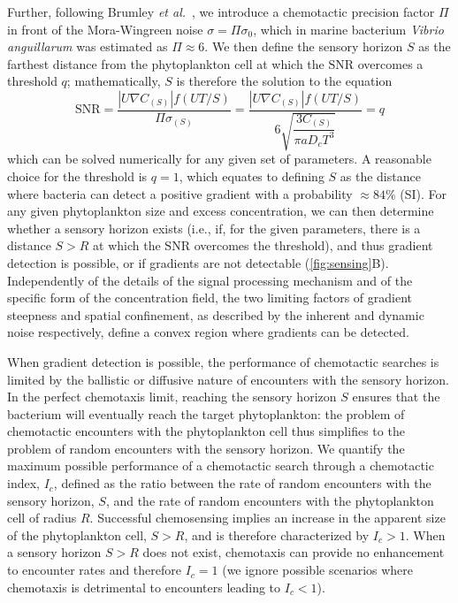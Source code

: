\documentclass[9pt,twocolumn,twoside]{pnas-new}
\newcommand{\SNR}{\mathrm{SNR}}
\begin{document}
Further, following Brumley \textit{et al.}~\cite{brumley2019bacteria}, we introduce a chemotactic precision factor $\Pi$ in front of the Mora-Wingreen noise $\sigma = \Pi\sigma_0$, which in marine bacterium \textit{Vibrio anguillarum} was estimated as $\Pi\approx6$.
We then define the sensory horizon $S$ as the farthest distance from the phytoplankton cell at which the $\SNR$ overcomes a threshold $q$; mathematically, $S$ is therefore the solution to the equation
\begin{equation}\label{eq:snr}
  \SNR = \dfrac{|U\nabla C_{(S)}|f(UT/S)}{\Pi\sigma_{(S)}} =
    \dfrac{|U\nabla C_{(S)}|f(UT/S)}{6\sqrt{\dfrac{3C_{(S)}}{\pi a D_c T^3}}} = q
\end{equation}
which can be solved numerically for any given set of parameters.
A reasonable choice for the threshold is $q=1$, which equates to defining $S$ as the distance where bacteria can detect a positive gradient with a probability $\approx 84\%$ (SI).
For any given phytoplankton size and excess concentration, we can then determine whether a sensory horizon exists (i.e., if, for the given parameters, there is a distance $S>R$ at which the $\SNR$ overcomes the threshold), and thus gradient detection is possible, or if gradients are not detectable (\autoref{fig:sensing}B).
Independently of the details of the signal processing mechanism and of the specific form of the concentration field, the two limiting factors of gradient steepness and spatial confinement, as described by the inherent and dynamic noise respectively, define a convex region where gradients can be detected.

When gradient detection is possible, the performance of chemotactic searches is limited by the ballistic or diffusive nature of encounters with the sensory horizon.
In the perfect chemotaxis limit, reaching the sensory horizon $S$ ensures that the bacterium will eventually reach the target phytoplankton: the problem of chemotactic encounters with the phytoplankton cell thus simplifies to the problem of random encounters with the sensory horizon.
We quantify the maximum possible performance of a chemotactic search through a chemotactic index, $I_c$, defined as the ratio between the rate of random encounters with the sensory horizon, $S$, and the rate of random encounters with the phytoplankton cell of radius $R$.
Successful chemosensing implies an increase in the apparent size of the phytoplankton cell, $S>R$, and is therefore characterized by $I_c>1$.
When a sensory horizon $S>R$ does not exist, chemotaxis can provide no enhancement to encounter rates and therefore $I_c=1$ (we ignore possible scenarios where chemotaxis is detrimental to encounters leading to $I_c<1$).
\end{document}
